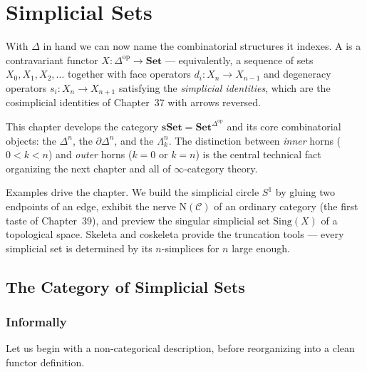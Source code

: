 
\chapter{Simplicial Sets}

\begin{overviewbox}
With $\Delta$ in hand we can now name the combinatorial structures it
indexes. A  is a contravariant functor $X :
\Delta^{\mathrm{op}} \to \mathbf{Set}$ — equivalently, a sequence of
sets $X_0, X_1, X_2, \ldots$ together with face operators $d_i :
X_n \to X_{n-1}$ and degeneracy operators $s_i : X_n \to X_{n+1}$
satisfying the \emph{simplicial identities}, which are the cosimplicial
identities of Chapter~37 with arrows reversed.

This chapter develops the category $\mathbf{sSet} =
\mathbf{Set}^{\Delta^{\mathrm{op}}}$ and its core combinatorial objects:
the  $\Delta^n$, the 
$\partial\Delta^n$, and the  $\Lambda^n_k$. The distinction
between \emph{inner} horns ($0 < k < n$) and \emph{outer} horns ($k = 0$
or $k = n$) is the central technical fact organizing the next chapter
and all of $\infty$-category theory.

Examples drive the chapter. We build the simplicial circle $S^1$ by
gluing two endpoints of an edge, exhibit the nerve $\mathrm{N}(\mathcal{C})$
of an ordinary category (the first taste of Chapter~39), and preview the
singular simplicial set $\mathrm{Sing}(X)$ of a topological space.
Skeleta and coskeleta provide the truncation tools — every simplicial
set is determined by its $n$-simplices for $n$ large enough.
\end{overviewbox}


\section{The Category of Simplicial Sets}
\label{sec:sset-defn}

\subsection{Informally}

Let us begin with a non-categorical description, before reorganizing
into a clean functor definition.

